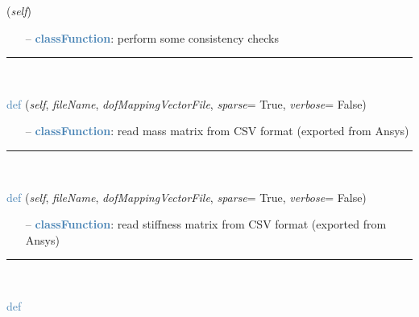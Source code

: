 \begin{itemize}[leftmargin=1.4cm]
\begin{itemize}[leftmargin=1.4cm]
\begin{itemize}[leftmargin=1.4cm]
\begin{itemize}[leftmargin=0.5cm]
\begin{itemize}[leftmargin=1.4cm]
\begin{itemize}[leftmargin=1.4cm]
\begin{itemize}[leftmargin=0.5cm]
\begin{flushleft}
({\it self})
\end{flushleft}
\setlength{\itemindent}{0.7cm}
\begin{itemize}[leftmargin=0.7cm]
\item[--]\textcolor{steelblue}{\bf classFunction}: perform some consistency checks
\vspace{12pt}\end{itemize}
%
\noindent\rule{8cm}{0.75pt}\vspace{1pt} \\ 
\begin{flushleft}
\noindent \textcolor{steelblue}{def {\bf {}}}\label{sec:FEM:FEMinterface:ReadMassMatrixFromAnsys}
({\it self}, {\it fileName}, {\it dofMappingVectorFile}, {\it sparse}= True, {\it verbose}= False)
\end{flushleft}
\setlength{\itemindent}{0.7cm}
\begin{itemize}[leftmargin=0.7cm]
\item[--]\textcolor{steelblue}{\bf classFunction}: read mass matrix from CSV format (exported from Ansys)
\vspace{12pt}\end{itemize}
%
\noindent\rule{8cm}{0.75pt}\vspace{1pt} \\ 
\begin{flushleft}
\noindent \textcolor{steelblue}{def {\bf {}}}\label{sec:FEM:FEMinterface:ReadStiffnessMatrixFromAnsys}
({\it self}, {\it fileName}, {\it dofMappingVectorFile}, {\it sparse}= True, {\it verbose}= False)
\end{flushleft}
\setlength{\itemindent}{0.7cm}
\begin{itemize}[leftmargin=0.7cm]
\item[--]\textcolor{steelblue}{\bf classFunction}: read stiffness matrix from CSV format (exported from Ansys)
\vspace{12pt}\end{itemize}
%
\noindent\rule{8cm}{0.75pt}\vspace{1pt} \\ 
\begin{flushleft}
\noindent \textcolor{steelblue}{def {\bf {}}}\label{sec:FEM:FEMinterface:ReadNodalCoordinatesFromAnsys}

\end{flushleft}
\end{itemize}
\end{itemize}
\end{itemize}
\end{itemize}
\end{itemize}
\end{itemize}
\end{itemize}
